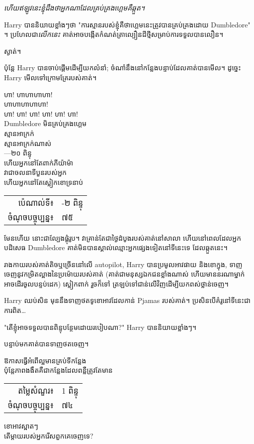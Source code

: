 \emph{ហើយឥឡូវនេះខ្ញុំដឹងថាអ្នកណាដែលគ្រប់គ្រងហ្គេមគឺឆ្កួត។}

Harry បាននិយាយខ្លាំងៗថា "ការស្មានរបស់ខ្ញុំគឺថាហ្គេមនេះត្រូវបានគ្រប់គ្រងដោយ Dumbledore" ។ ប្រហែលជា\emph{លើកនេះ} គាត់អាចបង្កើតកំណត់ត្រាល្បឿនដីថ្មីសម្រាប់ការទទួលបានលឿន។

ស្ងាត់។

ប៉ុន្តែ Harry បានចាប់ផ្តើមដើម្បីយកលំនាំ; ចំណាំនឹងនៅកន្លែងបន្ទាប់ដែលគាត់បានមើល។ ដូច្នេះ Harry មើលទៅក្រោមគ្រែរបស់គាត់។
\begin{writtenNote}
ហា! ហាហាហាហា!\\
ហាហាហាហាហា!\\
ហា! ហា! ហា! ហា! ហា! ហា!\\
Dumbledore មិនគ្រប់គ្រងហ្គេម \\
ស្មានអាក្រក់\\
ស្មានអាក្រក់ណាស់\\
—២០ ពិន្ទុ \\
ហើយអ្នកនៅតែពាក់ភីយ៉ាម៉ា\\
វាជាចលនាទីបួនរបស់អ្នក\\
ហើយអ្នកនៅតែស្លៀកខោទ្រនាប់

\begin{tabular}{rl}
ប៉េណាល់ទី៖ & -២ ពិន្ទុ\\
ចំណុចបច្ចុប្បន្ន៖ & ៧៥
\end{tabular}
\end{writtenNote}

មែនហើយ នោះជាល្បែងផ្គុំរូប។ វាគ្រាន់តែជាថ្ងៃដំបូងរបស់គាត់នៅសាលា ហើយនៅពេលដែលអ្នកបដិសេធ Dumbledore គាត់មិនបានស្គាល់ឈ្មោះអ្នកផ្សេងទៀតនៅទីនេះទេ ដែលឆ្កួតនេះ។

រាងកាយរបស់គាត់តិចឬច្រើននៅលើ autopilot, Harry បានប្រមូលអាវផាយ និងខោក្នុង, ទាញចេញនូវកម្រិតល្អាងនៃប្រម៉ោយរបស់គាត់ (គាត់ជាមនុស្សឯកជនខ្លាំងណាស់ ហើយមាននរណាម្នាក់អាចដើរចូលបន្ទប់ដេក) ស្លៀកពាក់ រួចក៏ទៅ ត្រឡប់​ទៅ​ជាន់​លើ​វិញ​ដើម្បី​យក​ពស់​ថ្លាន់​ចេញ។

Harry ឈប់សិន មុននឹងទាញថតទូខោអាវដែលកាន់ Pjamas របស់គាត់។ ប្រសិនបើគំរូនៅទីនេះជាការពិត…

"តើខ្ញុំអាចទទួលបានពិន្ទុបន្ថែមដោយរបៀបណា?" Harry បាននិយាយខ្លាំងៗ។

បន្ទាប់​មក​គាត់​បាន​ទាញ​ថត​ចេញ។
\begin{writtenNote}
ឱកាសធ្វើអំពើល្អមានគ្រប់ទីកន្លែង\\
ប៉ុន្តែភាពងងឹតគឺជាកន្លែងដែលពន្លឺត្រូវតែមាន

\begin{tabular}{rl}
តម្លៃសំណួរ៖ & 1 ពិន្ទុ \\
ចំណុចបច្ចុប្បន្ន៖ & ៧៤
\end{tabular}

ខោអាវស្អាតៗ\\
តើម្តាយរបស់អ្នករើសពួកគេចេញទេ?
\end{writtenNote}

